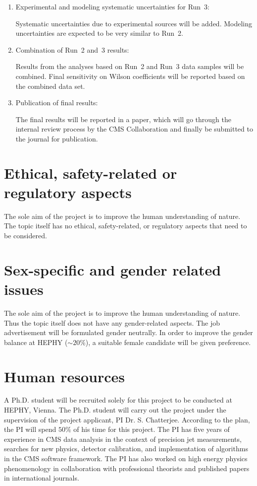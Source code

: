 \documentclass[a4paper,11pt]{article}
\begin{document}
{\begin{enumerate}
\item Experimental and modeling systematic uncertainties for Run~3:

Systematic uncertainties due to experimental sources will be added. Modeling uncertainties are expected to be very similar to Run~2.

\item Combination of Run~2 and~3 results:

Results from the analyses based on Run~2 and Run~3 data samples will be combined. Final sensitivity on Wilson coefficients will be reported based on the combined data set. 

\item Publication of final results:

The final results will be reported in a paper, which will go through the internal review process by the CMS Collaboration and finally be submitted to the journal for publication. 

\end{enumerate}


\section{Ethical, safety-related or regulatory aspects}

The sole aim of the project is to improve the human understanding of nature. 
The topic itself has no ethical, safety-related, or regulatory aspects that need to be considered.

\section{Sex-specific and gender related issues}

The sole aim of the project is to improve the human understanding of nature. 
Thus the topic itself does not have any gender-related aspects. 
The job advertisement will be formulated gender neutrally. 
In order to improve the gender balance at HEPHY
($\sim 20\%$), a suitable female candidate will be given preference.

\section{Human resources}

A Ph.D. student will be recruited solely for this project to be conducted at HEPHY, Vienna. 
The Ph.D. student will carry out the project under the supervision of the project applicant, PI Dr. S. Chatterjee. 
According to the plan, the PI will spend $50\%$ of his time for this project. 
The PI has five years of experience in CMS data analysis in the context of precision jet measurements, searches for new physics, detector calibration, and implementation of algorithms in the CMS software framework. 
The PI has also worked on high energy physics phenomenology in collaboration with professional theorists and published papers in international journals. 

}
\end{document}
